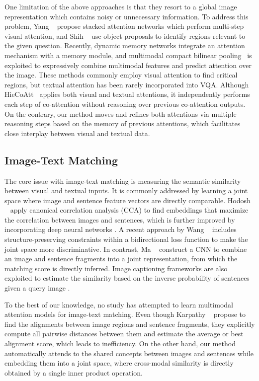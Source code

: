 \documentclass[10pt,twocolumn,letterpaper]{article}
\begin{document}
One limitation of the above approaches is that they resort to a global image representation which contains noisy or unnecessary information.
To address this problem, Yang \etal~\cite{yang2016stacked} propose stacked attention networks which perform multi-step visual attention, and Shih \etal~\cite{shih2016where} use object proposals to identify regions relevant to the given question.
Recently, dynamic memory networks \cite{xiong2016dynamic} integrate an attention mechanism with a memory module, and multimodal compact bilinear pooling~\cite{fukui2016multimodal} is exploited to expressively combine multimodal features and predict attention over the image.
These methods commonly employ visual attention to find critical regions, but textual attention has been rarely incorporated into VQA.
Although HieCoAtt~\cite{lu2016hierarchical} applies both visual and textual attentions, it independently performs each step of co-attention without reasoning over previous co-attention outputs.
On the contrary, our method moves and refines both attentions via multiple reasoning steps based on the memory of previous attentions, which facilitates close interplay between visual and textual data.

\subsection{Image-Text Matching}
The core issue with image-text matching is measuring the semantic similarity between visual and textual inputs.
It is commonly addressed by learning a joint space where image and sentence feature vectors are directly comparable.
Hodosh \etal~\cite{hodosh2013framing} apply canonical correlation analysis (CCA) to find embeddings that maximize the correlation between images and sentences, which is further improved by incorporating deep neural networks \cite{klein2015associating,yan2015deep}.
A recent approach by Wang \etal~\cite{wang2016learning} includes structure-preserving constraints within a bidirectional loss function to make the joint space more discriminative.
In contrast, Ma \etal~\cite{ma2015multimodal} construct a CNN to combine an image and sentence fragments into a joint representation, from which the matching score is directly inferred.
Image captioning frameworks are also exploited to estimate the similarity based on the inverse probability of sentences given a query image \cite{mao2015deep,vinyals2015show}.

To the best of our knowledge, no study has attempted to learn multimodal attention models for image-text matching. 
Even though Karpathy \etal~\cite{karpathy2014deep,karpathy2015deep} propose to find the alignments between image regions and sentence fragments, they explicitly compute all pairwise distances between them and estimate the average or best alignment score, which leads to inefficiency.
On the other hand, our method automatically attends to the shared concepts between images and sentences while embedding them into a joint space, where cross-modal similarity is directly obtained by a single inner product operation.
\end{document}
